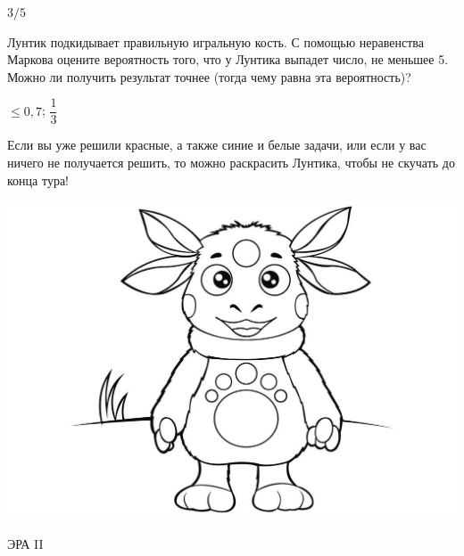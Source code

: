 \documentclass[12pt, addpoints]{exam} %
\begin{document}
\begin{questions}
\begin{solution}
$3/5$
\end{solution}

\question Лунтик подкидывает правильную игральную кость. С помощью неравенства Маркова оцените вероятность того, что у Лунтика выпадет число, не меньшее 5. Можно ли получить результат точнее (тогда чему равна эта вероятность)?
\begin{solution}
$\le 0,7$; $\dfrac{1}{3}$
\end{solution}

Если вы уже решили красные, а также синие и белые задачи, или если у вас ничего не получается решить, то можно раскрасить Лунтика, чтобы не скучать до конца тура!
\begin{center}
\includegraphics[scale=0.3]{luntik}
\end{center}

\end{questions}

\newpage
\vspace{0.2in}


\begin{center}
ЭРА II
\end{center}
\end{document}
